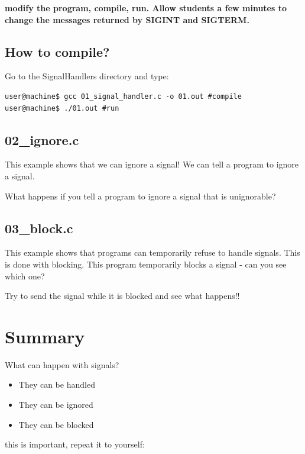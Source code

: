 \documentclass[8pt]{article}
\begin{document}
\begin{center}
\textbf{modify the program, compile, run. Allow students a few minutes to change the messages returned by SIGINT and SIGTERM. }
\end{center}


\subsection{How to compile?}
Go to the SignalHandlers directory and type:

\begin{lstlisting}
user@machine$ gcc 01_signal_handler.c -o 01.out #compile
user@machine$ ./01.out #run
\end{lstlisting}

\subsection{02\_ignore.c}
This example shows that we can ignore a signal! We can tell a program to ignore a signal. 

What happens if you tell a program to ignore a signal that is unignorable?


\subsection{03\_block.c}
This example shows that programs can temporarily refuse to handle signals. This is done with blocking. This program temporarily blocks a signal - can you see which one?

Try to send the signal while it is blocked and see what happens!!



\section{Summary}

What can happen with signals?

\begin{itemize}
\item They can be handled
\item They can be ignored
\item They can be blocked
\end{itemize}

this is important, repeat it to yourself:
\end{document}
